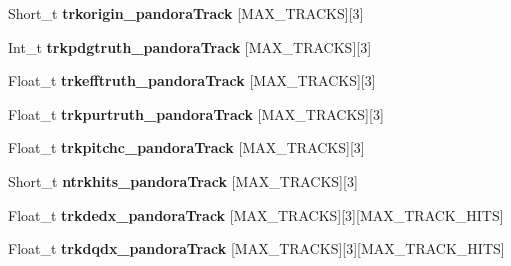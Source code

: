 \begin{DoxyCompactItemize}
\item 
\hypertarget{classanatree_abaa417392908ce717ead8301fdf45296}{Short\-\_\-t {\bfseries trkorigin\-\_\-pandora\-Track} \mbox{[}M\-A\-X\-\_\-\-T\-R\-A\-C\-K\-S\mbox{]}\mbox{[}3\mbox{]}}\label{classanatree_abaa417392908ce717ead8301fdf45296}

\item 
\hypertarget{classanatree_a80a42e7502ea74fea97d63ea47b18f8c}{Int\-\_\-t {\bfseries trkpdgtruth\-\_\-pandora\-Track} \mbox{[}M\-A\-X\-\_\-\-T\-R\-A\-C\-K\-S\mbox{]}\mbox{[}3\mbox{]}}\label{classanatree_a80a42e7502ea74fea97d63ea47b18f8c}

\item 
\hypertarget{classanatree_a4bd0c499d56e220df8aee0eca0b05b2c}{Float\-\_\-t {\bfseries trkefftruth\-\_\-pandora\-Track} \mbox{[}M\-A\-X\-\_\-\-T\-R\-A\-C\-K\-S\mbox{]}\mbox{[}3\mbox{]}}\label{classanatree_a4bd0c499d56e220df8aee0eca0b05b2c}

\item 
\hypertarget{classanatree_a755d1114f45ff20099c25bc737f50b74}{Float\-\_\-t {\bfseries trkpurtruth\-\_\-pandora\-Track} \mbox{[}M\-A\-X\-\_\-\-T\-R\-A\-C\-K\-S\mbox{]}\mbox{[}3\mbox{]}}\label{classanatree_a755d1114f45ff20099c25bc737f50b74}

\item 
\hypertarget{classanatree_a7acbb31c0dcf973553259ed30061b020}{Float\-\_\-t {\bfseries trkpitchc\-\_\-pandora\-Track} \mbox{[}M\-A\-X\-\_\-\-T\-R\-A\-C\-K\-S\mbox{]}\mbox{[}3\mbox{]}}\label{classanatree_a7acbb31c0dcf973553259ed30061b020}

\item 
\hypertarget{classanatree_a5c339578d12ea63d45588d2ce9ef8313}{Short\-\_\-t {\bfseries ntrkhits\-\_\-pandora\-Track} \mbox{[}M\-A\-X\-\_\-\-T\-R\-A\-C\-K\-S\mbox{]}\mbox{[}3\mbox{]}}\label{classanatree_a5c339578d12ea63d45588d2ce9ef8313}

\item 
\hypertarget{classanatree_a62256c9cc8a24288464c9da99060549c}{Float\-\_\-t {\bfseries trkdedx\-\_\-pandora\-Track} \mbox{[}M\-A\-X\-\_\-\-T\-R\-A\-C\-K\-S\mbox{]}\mbox{[}3\mbox{]}\mbox{[}M\-A\-X\-\_\-\-T\-R\-A\-C\-K\-\_\-\-H\-I\-T\-S\mbox{]}}\label{classanatree_a62256c9cc8a24288464c9da99060549c}

\item 
\hypertarget{classanatree_aea4e01f3e29dc7c8b9ef4e91d5768b70}{Float\-\_\-t {\bfseries trkdqdx\-\_\-pandora\-Track} \mbox{[}M\-A\-X\-\_\-\-T\-R\-A\-C\-K\-S\mbox{]}\mbox{[}3\mbox{]}\mbox{[}M\-A\-X\-\_\-\-T\-R\-A\-C\-K\-\_\-\-H\-I\-T\-S\mbox{]}}\label{classanatree_aea4e01f3e29dc7c8b9ef4e91d5768b70}


\end{DoxyCompactItemize}
